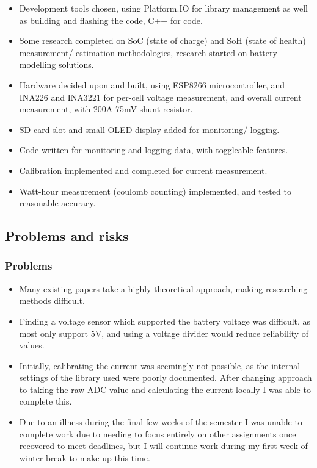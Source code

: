 \documentclass[11pt]{article}
\begin{document}
\begin{itemize}
    \item Development tools chosen, using Platform.IO for library management as well as building and flashing the code, C++ for code.
    \item Some research completed on SoC (state of charge) and SoH (state of health) measurement/ estimation methodologies, research started on battery modelling solutions.
    \item Hardware decided upon and built, using ESP8266 microcontroller, and INA226 and INA3221 for per-cell voltage measurement, and overall current measurement, with 200A 75mV shunt resistor.
    \item SD card slot and small OLED display added for monitoring/ logging.
    \item Code written for monitoring and logging data, with toggleable features.
    \item Calibration implemented and completed for current measurement.
    \item Watt-hour measurement (coulomb counting) implemented, and tested to reasonable accuracy.
\end{itemize}    

\subsection{Problems and risks}\label{problems-and-risks}

\subsubsection{Problems}\label{problems}

\begin{itemize}
    \item Many existing papers take a highly theoretical approach, making researching methods difficult.
    \item Finding a voltage sensor which supported the battery voltage was difficult, as most only support 5V, and using a voltage divider would reduce reliability of values.
    \item Initially, calibrating the current was seemingly not possible, as the internal settings of the library used were poorly documented. After changing approach to taking the raw ADC value and calculating the current locally I was able to complete this.
    \item Due to an illness during the final few weeks of the semester I was unable to complete work due to needing to focus entirely on other assignments once recovered to meet deadlines, but I will continue work during my first week of winter break to make up this time.
\end{itemize}
\end{document}
